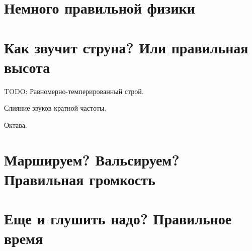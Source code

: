 \section{Немного правильной физики}


\section{Как звучит струна? Или правильная высота}

TODO: Равномерно-темперированный строй.

Слияние звуков кратной частоты.

Октава.

\section{Маршируем? Вальсируем? Правильная громкость}
\label{sec:music:sounds}


\section{Еще и глушить надо? Правильное время}



